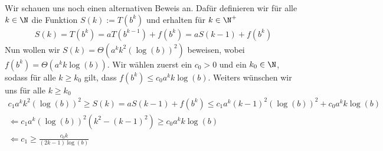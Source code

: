 \begin{solution}
	Wir schauen uns noch einen alternativen Beweis an. Dafür definieren wir für alle $k \in \N$ die Funktion $S(k) := T(b^k)$ und erhalten für $k \in \N^+$
	\begin{align*}
	S(k) = T(b^k) = aT(b^{k-1}) + f(b^k) = a S(k-1) + f(b^k)
	\end{align*}
	Nun wollen wir $S(k) = \Theta(a^k k^2 (\log(b))^2)$ beweisen, wobei $f(b^k) = \Theta(a^k k\log(b))$. Wir wählen zuerst ein $c_0 > 0$ und ein $k_0 \in \N$, sodass für alle $k \geq k_0$ gilt, dass $f(b^k) \leq c_0 a^k k \log(b)$. Weiters wünschen wir uns für alle $k \geq k_0$
	\begin{align*}
	c_1 a^k k^2 (\log(b))^2 \geq S(k) = a S(k-1) + f(b^k) \leq  c_1 a^k (k - 1)^2 (\log(b))^2 + c_0 a^k k \log(b) \\
	\Leftarrow c_1 a^k (\log(b))^2( k^2 - (k -1)^2) \geq c_0 a^k k \log(b) \\
	\Leftarrow c_1 \geq \frac{c_0 k}{(2k -1) \log(b)}
	\end{align*}
\end{solution}